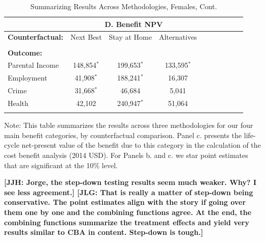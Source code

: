 \documentclass[static]{JJH-Beamer}
\begin{document}
\begin{frame}
 \addtocounter{framenumber}{-1}

\begin{table}[H]
\addtocounter{table}{-1}
\caption{Summarizing Results Across Methodologies, Females, Cont.}
\begin{center}
\begin{tabular}{lccccccccc}
\toprule
&  \multicolumn{3}{c}{\textbf{D. Benefit NPV}} \\
\midrule
\textbf{Counterfactual:} & Next Best & Stay at Home & Alternatives & \\ \\
\textbf{Outcome:} & \\
Parental Income &  148,854$^*$ & 199,653$^*$  & 133,595$^*$ \\
Employment & 41,908$^*$ & 188,241$^*$ & 16,307 \\
Crime & 31,668$^*$ & 46,684 & 5,041 \\
Health & 42,102 & 240,947$^*$ & 51,064 \\ \\ \bottomrule
\end{tabular}
\end{center}
\tiny\flushleft Note: This table summarizes the results across three methodologies for our four main benefit categories, by counterfactual comparison. Panel c. presents the life-cycle net-present value of the benefit due to this category in the calculation of the cost benefit analysis (2014 USD). For Panels b. and c. we star point estimates that are significant at the 10\% level.\\
\end{table}

\end{frame}

\textbf{[JJH: Jorge, the step-down testing results seem much weaker. Why? I see less agreement.] [JLG: That is really a matter of step-down being conservative. The point estimates align with the story if going over them one by one and the combining functions agree. At the end, the combining functions summarize the treatment effects and yield very results similar to CBA in content. Step-down is tough.]}
\end{document}

